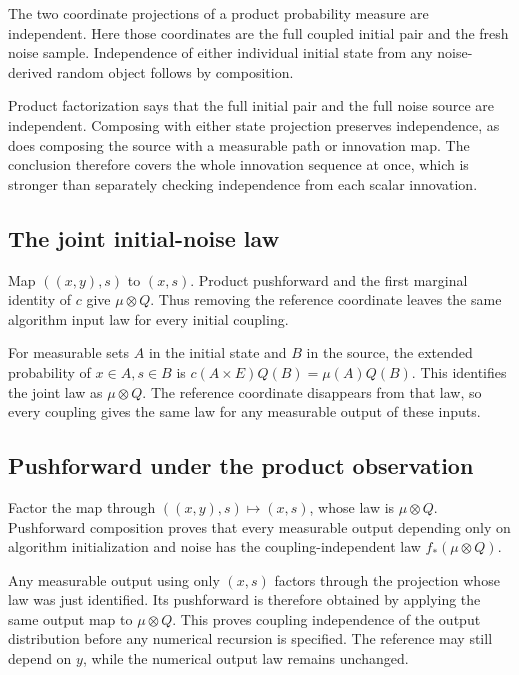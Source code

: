 \documentclass[11pt,a4paper]{report}
\begin{document}
The two coordinate projections of a product probability measure are independent. Here those coordinates are the full coupled initial pair and the fresh noise sample. Independence of either individual initial state from any noise-derived random object follows by composition.



Product factorization says that the full initial pair and the full noise source are independent. Composing with either state projection preserves independence, as does composing the source with a measurable path or innovation map. The conclusion therefore covers the whole innovation sequence at once, which is stronger than separately checking independence from each scalar innovation.

\subsection{\texorpdfstring{The joint initial-noise law}{The joint initial-noise law}}
\label{report-step-UnadjustedLangevin-InitialExtension-lean-9}


Map \(((x,y),s)\) to \((x,s)\). Product pushforward and the first marginal identity of \(c\) give \(\mu\otimes Q\). Thus removing the reference coordinate leaves the same algorithm input law for every initial coupling.



For measurable sets \(A\) in the initial state and \(B\) in the source, the extended probability of \(x\in A,s\in B\) is \(c(A\times E)Q(B)=\mu(A)Q(B)\). This identifies the joint law as \(\mu\otimes Q\). The reference coordinate disappears from that law, so every coupling gives the same law for any measurable output of these inputs.

\subsection{\texorpdfstring{Pushforward under the product observation}{Pushforward under the product observation}}
\label{report-step-UnadjustedLangevin-InitialExtension-lean-10}


Factor the map through \(((x,y),s)\mapsto(x,s)\), whose law is \(\mu\otimes Q\). Pushforward composition proves that every measurable output depending only on algorithm initialization and noise has the coupling-independent law \(f_*(\mu\otimes Q)\).



Any measurable output using only \((x,s)\) factors through the projection whose law was just identified. Its pushforward is therefore obtained by applying the same output map to \(\mu\otimes Q\). This proves coupling independence of the output distribution before any numerical recursion is specified. The reference may still depend on \(y\), while the numerical output law remains unchanged.
\end{document}
